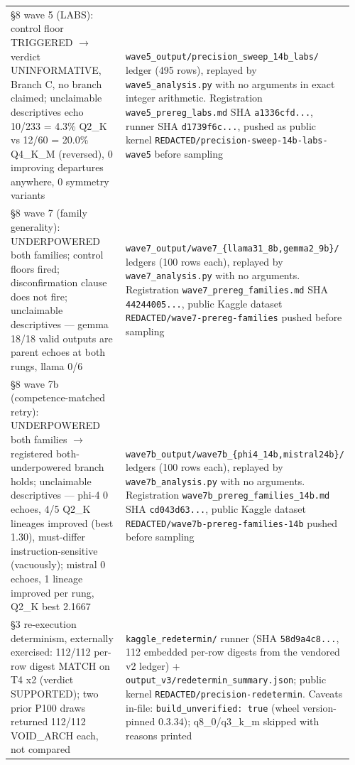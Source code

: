 \begin{longtable}[]{@{}>{\raggedright\arraybackslash}p{0.400\linewidth}>{\raggedright\arraybackslash}p{0.560\linewidth}@{}}
§8 wave 5 (LABS): control floor TRIGGERED \(\rightarrow\) verdict UNINFORMATIVE, Branch C, no branch claimed; unclaimable descriptives echo 10/233 = 4.3\% Q2\_K vs 12/60 = 20.0\% Q4\_K\_M (reversed), 0 improving departures anywhere, 0 symmetry variants & \texttt{wave5\_\allowbreak output/\allowbreak precision\_\allowbreak sweep\_\allowbreak 14b\_\allowbreak labs/\allowbreak } ledger (495 rows), replayed by \texttt{wave5\_analysis.py} with no arguments in exact integer arithmetic. Registration \texttt{wave5\_prereg\_labs.md} SHA \texttt{a1336cfd...}, runner SHA \texttt{d1739f6c...}, pushed as public kernel \texttt{REDACTED/precision-sweep-14b-labs-wave5} before sampling \\
§8 wave 7 (family generality): UNDERPOWERED both families; control floors fired; disconfirmation clause does not fire; unclaimable descriptives --- gemma 18/18 valid outputs are parent echoes at both rungs, llama 0/6 & \texttt{wave7\_output/wave7\_\{llama31\_8b,gemma2\_9b\}/} ledgers (100 rows each), replayed by \texttt{wave7\_analysis.py} with no arguments. Registration \texttt{wave7\_prereg\_families.md} SHA \texttt{44244005...}, public Kaggle dataset \texttt{REDACTED/wave7-prereg-families} pushed before sampling \\
§8 wave 7b (competence-matched retry): UNDERPOWERED both families \(\rightarrow\) registered both-underpowered branch holds; unclaimable descriptives --- phi-4 0 echoes, 4/5 Q2\_K lineages improved (best 1.30), must-differ instruction-sensitive (vacuously); mistral 0 echoes, 1 lineage improved per rung, Q2\_K best 2.1667 & \texttt{wave7b\_output/wave7b\_\{phi4\_14b,mistral24b\}/} ledgers (100 rows each), replayed by \texttt{wave7b\_analysis.py} with no arguments. Registration \texttt{wave7b\_prereg\_families\_14b.md} SHA \texttt{cd043d63...}, public Kaggle dataset \texttt{REDACTED/wave7b-prereg-families-14b} pushed before sampling \\
§3 re-execution determinism, externally exercised: 112/112 per-row digest MATCH on T4 x2 (verdict SUPPORTED); two prior P100 draws returned 112/112 VOID\_ARCH each, not compared & \texttt{kaggle\_redetermin/} runner (SHA \texttt{58d9a4c8...}, 112 embedded per-row digests from the vendored v2 ledger) + \texttt{output\_v3/redetermin\_summary.json}; public kernel \texttt{REDACTED/precision-redetermin}. Caveats in-file: \texttt{build\_unverified:\ true} (wheel version-pinned 0.3.34); q8\_0/q3\_k\_m skipped with reasons printed \\

\end{longtable}
